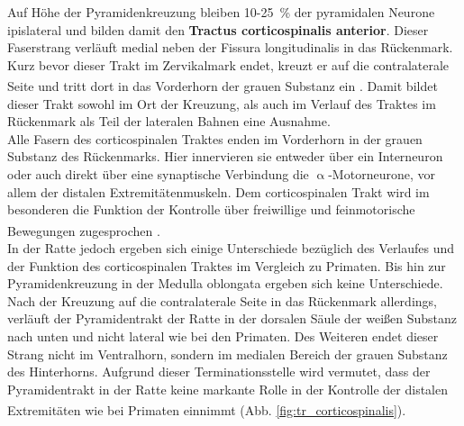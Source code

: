 \documentclass[12pt,a4paper,pdftex]{article}
\begin{document}
Auf Höhe der Pyramidenkreuzung bleiben 10-25~\% der pyramidalen Neurone ipislateral und bilden damit den \textbf{Tractus corticospinalis anterior}. Dieser Faserstrang verläuft medial neben der Fissura longitudinalis in das  Rückenmark. Kurz bevor dieser Trakt im Zervikalmark endet, kreuzt er auf die contralaterale Seite und tritt dort in das Vorderhorn der grauen Substanz ein \textsuperscript{\cite[3]{trepel2011neuroanatomie}}. Damit bildet dieser Trakt sowohl im Ort der Kreuzung, als auch im Verlauf des Traktes im Rückenmark als Teil der lateralen Bahnen eine Ausnahme. \\
Alle Fasern des corticospinalen Traktes enden im Vorderhorn in der grauen Substanz des Rückenmarks. Hier innervieren sie entweder über ein Interneuron oder auch direkt über eine synaptische Verbindung die $\upalpha$-Motorneurone, vor allem der distalen Extremitätenmuskeln. Dem corticospinalen Trakt wird im besonderen die Funktion der Kontrolle über freiwillige und feinmotorische Bewegungen zugesprochen \textsuperscript{\cite[3]{trepel2011neuroanatomie}}. \\
In der Ratte jedoch ergeben sich einige Unterschiede bezüglich des Verlaufes und der Funktion des corticospinalen Traktes im Vergleich zu Primaten. Bis hin zur Pyramidenkreuzung in der Medulla oblongata ergeben sich keine Unterschiede. Nach der Kreuzung auf die contralaterale Seite in das Rückenmark allerdings, verläuft der Pyramidentrakt der Ratte in der dorsalen Säule der weißen Substanz nach unten und nicht lateral wie bei den Primaten. Des Weiteren endet dieser Strang nicht im Ventralhorn, sondern im medialen Bereich der grauen Substanz des Hinterhorns. Aufgrund dieser Terminationsstelle wird vermutet, dass der Pyramidentrakt in der Ratte keine markante Rolle in der Kontrolle der distalen Extremitäten wie bei Primaten einnimmt \textsuperscript{\cite[8]{paxinos2014rat}} (Abb. \ref{fig:tr_corticospinalis}).  
\end{document}
